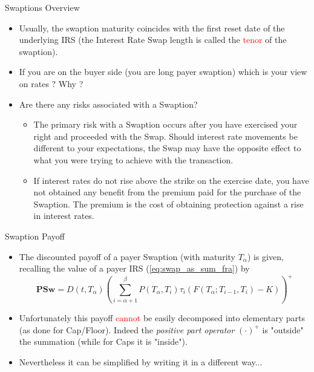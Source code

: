 \documentclass{beamer}
\begin{document}
\begin{frame}{Swaptions Overview}
	\begin{itemize}
	\item<1-> Usually, the swaption maturity coincides with the first reset date of the underlying IRS (the Interest Rate Swap length is called the \textcolor{red}{tenor} of the swaption).	
	\item<2-> If you are on the buyer side (you are long payer swaption) which is your view on rates ? Why ?
	\item<3-> Are there any risks associated with a Swaption?
	\begin{itemize}
		\item<4-> The primary risk with a Swaption occurs after you have exercised your right and proceeded with the Swap. Should interest rate movements be different to your expectations, the Swap may have the opposite effect to what you were trying to achieve with the transaction. 
		\item<5-> If interest rates do not rise above the strike on the exercise date, you have not obtained any benefit from the premium paid for the purchase of the Swaption. The premium is the cost of obtaining protection against a rise in interest rates.
	\end{itemize}
\end{itemize}
\end{frame}

\begin{frame}{Swaption Payoff}
\begin{itemize}
	\item<1-> The discounted payoff of a payer Swaption (with maturity $T_\alpha$) is given, recalling the value of a payer IRS (\cref{eq:swap_as_sum_fra}) by
	\begin{equation}
		\textbf{PSw}=D(t,T_\alpha)\left(\sum_{i=\alpha+1}^\beta P(T_\alpha,T_i)\tau_i (F(T_\alpha;T_{i-1},T_i) - K)\right)^+
		\label{eq:swaption_payoff_std}
	\end{equation}
	\item<2-> Unfortunately this payoff \textcolor{red}{cannot} be easily decomposed into elementary parts (as done for Cap/Floor). Indeed the \emph{positive part operator} $(\cdot)^+$ is "outside" the summation (while for Caps it is "inside").
	\item<3-> Nevertheless it can be simplified by writing it in a different way...
\end{itemize}
\end{frame}
\end{document}
